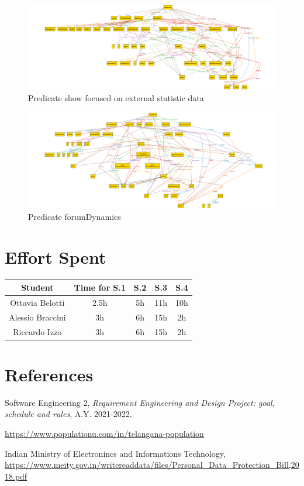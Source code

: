 \documentclass[table, 12pt]{article}
\begin{document}
\begin{figure}
    \centering
    \includegraphics[scale=0.35, center]{assets/AlloyInstances/ExternalData.png}
    \caption{Predicate show focused on external statistic data}
    \label{fig: external data}
\end{figure}

\begin{figure}
    \centering
    \includegraphics[scale=0.35, center]{assets/AlloyInstances/forumDynamics.png}
    \caption{Predicate forumDynamics}
    \label{fig: forumDynamics}
\end{figure}


\newpage
\section{Effort Spent}
    \begin{tabular}{| c || c | c| c| c |}
        \hline
        Student & Time for S.1 & S.2 & S.3 & S.4 \\ \hline
        Ottavia Belotti & 2.5h & 5h & 11h & 10h \\
        Alessio Braccini & 3h & 6h & 15h & 2h \\
        Riccardo Izzo & 3h & 6h & 15h & 2h \\
        \hline
    \end{tabular}
\section{References}

\begin{thebibliography}{9}
    Software Engineering 2,
    \emph{Requirement Engineering and Design Project: goal, schedule and rules}, A.Y. 2021-2022.

    \url{https://www.populationu.com/in/telangana-population}

    Indian Ministry of Electronincs and Informations Technology, 
    \url{https://www.meity.gov.in/writereaddata/files/Personal_Data_Protection_Bill,2018.pdf}

\end{thebibliography}
\end{document}
